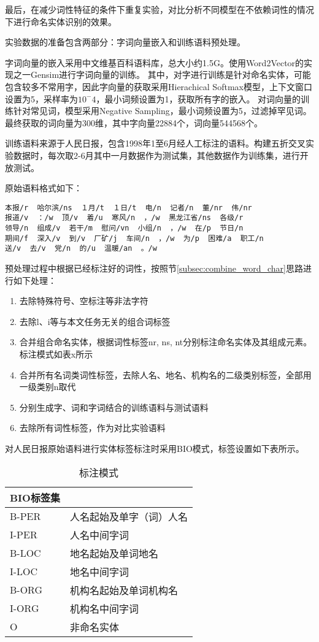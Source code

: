 最后，在减少词性特征的条件下重复实验，对比分析不同模型在不依赖词性的情况下进行命名实体识别的效果。


实验数据的准备包含两部分：字词向量嵌入和训练语料预处理。

字词向量的嵌入采用中文维基百科语料库，总大小约1.5G。使用Word2Vector的实现之一Gensim进行字词向量的训练。
其中，对字进行训练是针对命名实体，可能包含较多不常用字，因此字向量的获取采用Hierachical Softmax模型，上下文窗口设置为5，采样率为$10^-4$，最小词频设置为1，获取所有字的嵌入。
对词向量的训练针对常见词，模型采用Negative Sampling，最小词频设置为5，过滤掉罕见词。
最终获取的词向量为300维，其中字向量22884个，词向量544568个。

训练语料来源于人民日报，包含1998年1至6月经人工标注的语料。构建五折交叉实验数据时，每次取2-6月其中一月数据作为测试集，其他数据作为训练集，进行开放测试。

原始语料格式如下：

\begin{verbatim}
本报/r  哈尔滨/ns  １月/t  １日/t  电/n  记者/n  董/nr  伟/nr
报道/v  ：/w  顶/v  着/u  寒风/n  ，/w  黑龙江省/ns  各级/r
领导/n  组成/v  若干/m  慰问/vn  小组/n  ，/w  在/p  节日/n
期间/f  深入/v  到/v  厂矿/j  车间/n  ，/w  为/p  困难/a  职工/n
送/v  去/v  党/n  的/u  温暖/an  。/w
\end{verbatim}

预处理过程中根据已经标注好的词性，按照节\ref{subsec:combine_word_char}思路进行如下处理：
\begin{enumerate}
    \item 去除特殊符号、空标注等非法字符
    \item 去除l、i等与本文任务无关的组合词标签
    \item 合并组合命名实体，根据词性标签nr, ns, nt分别标注命名实体及其组成元素。标注模式如表x所示
    \item 合并所有名词类词性标签，去除人名、地名、机构名的二级类别标签，全部用一级类别n取代
    \item 分别生成字、词和字词结合的训练语料与测试语料
    \item 去除所有词性标签，作为对比实验语料
\end{enumerate}

对人民日报原始语料进行实体标签标注时采用BIO模式，标签设置如下表所示。

\begin{table}[H]
    \centering
    \caption{标注模式}
    \begin{tabular}{ll}
        \toprule
            BIO标签集\\
        \midrule
        B-PER & 人名起始及单字（词）人名 \\
        I-PER & 人名中间字词 \\
        B-LOC & 地名起始及单词地名 \\
        I-LOC & 地名中间字词 \\
        B-ORG & 机构名起始及单词机构名 \\
        I-ORG & 机构名中间字词 \\
        O & 非命名实体\\
        \bottomrule
    \end{tabular}
\end{table}

